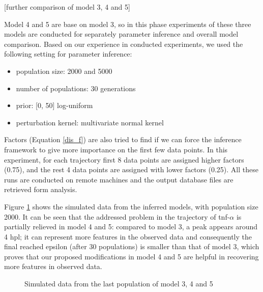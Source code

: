 \documentclass[12pt,a4paper]{report}
\begin{document}
[further comparison of model 3, 4 and 5]

Model 4 and 5 are base on model 3, so in this phase experiments of these three models are conducted for separately parameter inference and overall model comparison. Based on our experience in conducted experiments, we used the following setting for parameter inference:

\begin{itemize}
    \item population size: 2000 and 5000
    \item number of populations: 30 generations
    \item prior: [0, 50] log-uniform
    \item perturbation kernel: multivariate normal kernel
\end{itemize}

Factors (Equation \ref{dis_f}) are also tried to find if we can force the inference framework to give more importance on the first few data points. In this experiment, for each trajectory first 8 data points are assigned higher factors (0.75), and the rest 4 data points are assigned with lower factors (0.25). All these runs are conducted on remote machines and the output database files are retrieved form analysis.

Figure \ref{fig:resultCurve345} shows the simulated data from the inferred models, with population size 2000. It can be seen that the addressed problem in the trajectory of tnf-$\alpha$ is partially relieved in model 4 and 5: compared to model 3, a peak appears around 4 hpl; it can represent more features in the observed data and consequently the final reached epsilon (after 30 populations) is smaller than that of model 3, which proves that our proposed modifications in model 4 and 5 are helpful in recovering more features in observed data.

\begin{figure}
    \begin{center}
    \end{center}
    
    \caption{Simulated data from the last population of model 3, 4 and 5}
    \label{fig:resultCurve345}
    
\end{figure}
\end{document}
